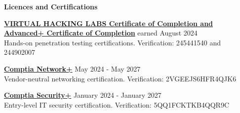 \documentclass[12pt]{article}
\begin{document}

\vspace{0.2in} %


\begin{center}
	{\noindent \bfseries Licences and Certifications}
\end{center}

\vspace{0.1pt}


\noindent
{\bfseries \href{https://drive.proton.me/urls/WQCXTSR8C0#8HdkpbN5AP9T}{VIRTUAL HACKING LABS Certificate of Completion \newline and Advanced+ Certificate of Completion}} \hfill earned August 2024 \\ 
\noindent Hands-on penetration testing certifications. \hfill Verification: 245441540 and 244902007
\noindent

\vspace{0.1in}

\noindent
    {\bfseries \href{https://www.credly.com/badges/26299a0a-52db-411c-9df8-f182ff93b8f1/public_url}{Comptia Network+}} \hfill May 2024 - May 2027 \\
    \noindent Vendor-neutral networking certification. \hfill Verification: 2VGEEJS6HFR4QJK6
\noindent

\vspace{0.1in}

\noindent
    {\bfseries \href{https://www.credly.com/badges/2c28f48a-77e5-4b3d-b38e-2b2e355a7eec/public_url}{Comptia Security+}} \hfill January 2024 - January 2027 \\[0.04in]
    \noindent Entry-level IT security certification. \hfill Verification: 5QQ1FCKTKB4QQR9C
\noindent






\end{document}
